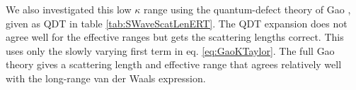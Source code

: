 \documentclass[preprint,showpacs,preprintnumbers,amsmath,amssymb]{revtex4}
\begin{document}
We also investigated this low $\kappa$ range using the quantum-defect theory of Gao \cite{Gao1998}, given as QDT in table \ref{tab:SWaveScatLenERT}. The QDT expansion does not agree well for the effective ranges but gets the scattering lengths correct. This uses only the slowly varying first term in eq. \ref{eq:GaoKTaylor}. The full Gao theory gives a scattering length and effective range that agrees relatively well with the long-range van der Waals expression.







\end{document}

